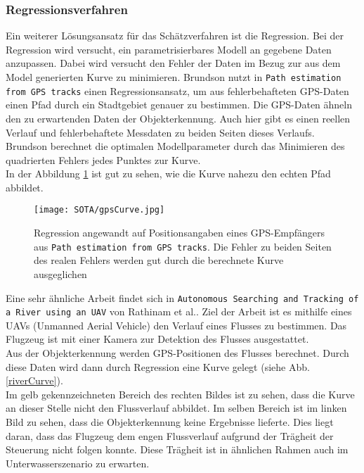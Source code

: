 \subsubsection{Regressionsverfahren}
Ein weiterer Lösungsansatz für das Schätzverfahren ist die Regression. Bei der Regression wird versucht, ein parametrisierbares Modell an gegebene Daten anzupassen. Dabei wird versucht den Fehler der Daten im Bezug zur aus dem Model generierten Kurve zu minimieren.
Brundson nutzt in \texttt{Path estimation from GPS tracks}\cite{brunsdon2007path} einen Regressionsansatz, um aus fehlerbehafteten GPS-Daten einen Pfad durch ein Stadtgebiet genauer zu bestimmen. Die GPS-Daten ähneln den zu erwartenden Daten der Objekterkennung. Auch hier gibt es einen reellen Verlauf und fehlerbehaftete Messdaten zu beiden Seiten dieses Verlaufs.\\
Brundson berechnet die optimalen Modellparameter durch das Minimieren des quadrierten Fehlers jedes Punktes zur Kurve.\\
In der Abbildung \ref{gpsfit} ist gut zu sehen, wie die Kurve nahezu den echten Pfad abbildet.
\begin{figure}[H]
\centering
\texttt{[image: SOTA/gpsCurve.jpg]}
\caption[Abbildung eines Pfadverlaufs auf Basis von GPS-Daten.]{Regression angewandt auf Positionsangaben eines GPS-Empfängers aus \texttt{Path estimation from GPS tracks}\cite{brunsdon2007path}. Die Fehler zu beiden Seiten des realen Fehlers werden gut durch die berechnete Kurve ausgeglichen}
\label{gpsfit}
\end{figure}
Eine sehr ähnliche Arbeit findet sich in \texttt{Autonomous Searching and Tracking of a River using an UAV}\cite{rathinam2007autonomous} von Rathinam et al.. Ziel der Arbeit ist es mithilfe eines UAVs (Unmanned Aerial Vehicle) den Verlauf eines Flusses zu bestimmen. Das Flugzeug ist mit einer Kamera zur Detektion des Flusses ausgestattet.\\
Aus der Objekterkennung werden GPS-Positionen des Flusses berechnet. Durch diese Daten wird dann durch Regression eine Kurve gelegt (siehe Abb. \ref{riverCurve}).\\
Im gelb gekennzeichneten Bereich des rechten Bildes ist zu sehen, dass die Kurve an dieser Stelle nicht den Flussverlauf abbildet. Im selben Bereich ist im linken Bild zu sehen, dass die Objekterkennung keine Ergebnisse lieferte. Dies liegt daran, dass das Flugzeug dem engen Flussverlauf aufgrund der Trägheit der Steuerung nicht folgen konnte. Diese Trägheit ist in ähnlichen Rahmen auch im Unterwasserszenario zu erwarten.\\
